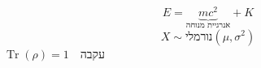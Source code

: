 \[ E = \underbrace{mc^2}_{\text{אנרגיית מנוחה}} + K \]
\[ X \sim \text{נורמלי}(\mu,\sigma^2) \]
\( \operatorname{Tr}(\rho) = 1 \quad \text{עקבה} \)
